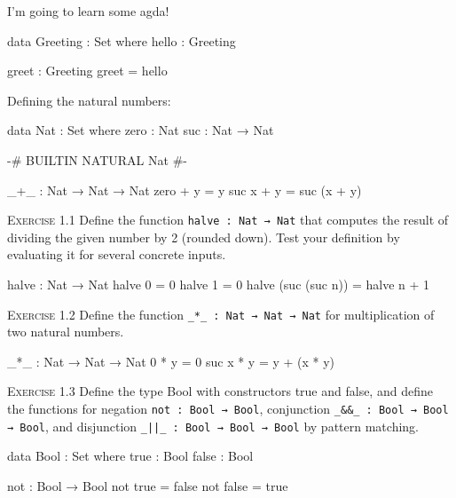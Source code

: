 \documentclass{article}
\newcommand{\ttx}{\texttt}
\begin{document}
\noindent
I'm going to learn some agda!

\begin{code}
data Greeting : Set where
    hello : Greeting

greet : Greeting
greet = hello
\end{code}

\noindent
Defining the natural numbers:

\begin{code}
data Nat : Set where
    zero : Nat
    suc : Nat → Nat

{-# BUILTIN NATURAL Nat #-}

_+_ : Nat → Nat → Nat
zero + y = y
suc x + y = suc (x + y)
\end{code}

\noindent
\textsc{Exercise 1.1} Define the function \ttx{halve : Nat → Nat} that computes the result of dividing the given number by 2 (rounded down). Test your definition by evaluating it for several concrete inputs.

\begin{code}
halve : Nat → Nat
halve 0 = 0
halve 1 = 0
halve (suc (suc n)) = halve n + 1
\end{code}

\noindent
\textsc{Exercise 1.2} Define the function \ttx{_*_ : Nat → Nat → Nat} for multiplication of two natural numbers.

\begin{code}
_*_ : Nat → Nat → Nat
0 * y = 0
suc x * y = y + (x * y)
\end{code}

\noindent
\textsc{Exercise 1.3} Define the type Bool with constructors true and false, and define the functions for negation \verb$not : Bool → Bool$, conjunction \verb$_&&_ : Bool → Bool → Bool$, and disjunction \verb$_||_ : Bool → Bool → Bool$ by pattern matching.

\begin{code}
data Bool : Set where
    true : Bool
    false : Bool

not : Bool → Bool
not true = false
not false = true
\end{code}
\end{document}
